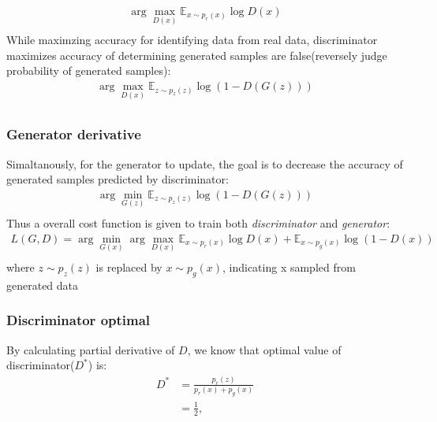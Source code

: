 \documentclass{article}
\newcommand{\argmax}{\arg\!\max}
\newcommand{\argmin}{\arg\!\min}
\begin{document}
\begin{equation}
\begin{gathered}
\argmax_{D(x)} \mathbb{E}_{x\sim p_{r}(x)} \log{D(x)}\\
\end{gathered}
\end{equation}
While maximzing accuracy for identifying data from real data, discriminator maximizes accuracy of determining generated samples are false(reversely judge probability of generated samples):
\begin{equation}
    \begin{gathered}
\argmax_{D(x)} \mathbb{E}_{z\sim p_{z}(z)} \log{(1-D(G(z)))}\\
    \end{gathered}
\end{equation}
\subsubsection*{Generator derivative}
Simaltanously, for the generator to update, the goal is to decrease the accuracy of generated samples predicted by discriminator:
\begin{equation}
    \begin{gathered}
\argmin_{G(z)} \mathbb{E}_{z\sim p_{z}(z)} \log{(1-D(G(z)))}\\
    \end{gathered}
\end{equation}
Thus a overall cost function is given to train both \textit{discriminator} and \textit{generator}:
\begin{equation}
    \begin{gathered}
\textit{L}(G,D) = \argmin_{G(x)} \argmax_{D(x)} \mathbb{E}_{x\sim p_{r}(x)} \log{D(x)} + \mathbb{E}_{x\sim p_{g}(x)} \log{(1-D(x))}\\
    \end{gathered}
\end{equation}
where $z\sim p_z{(z)}$ is replaced by $x\sim p_g{(x)}$, indicating x sampled from generated data 
\subsubsection*{Discriminator optimal}
By calculating partial derivative of $D$, we know that optimal value of discriminator($D^*$) is:
\begin{align}\label{eq5}
D^{*} &= \frac{p_{r}(z)}{p_{r}(x)+p_{g}(x)} \nonumber\\
&= \frac{1}{2},
\end{align}
\end{document}
